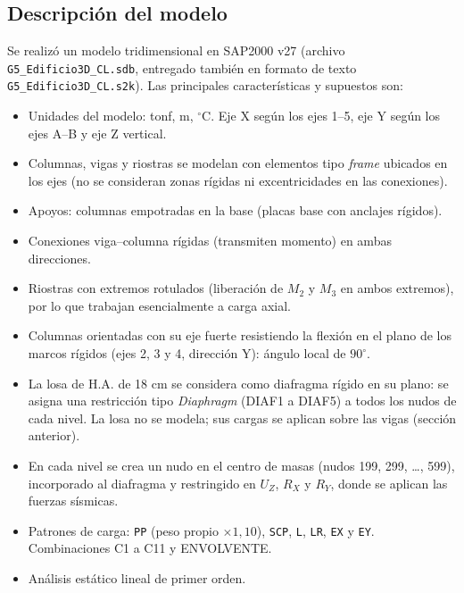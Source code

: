 \documentclass[11pt,letterpaper]{article}
\begin{document}
\subsection{Descripción del modelo}
Se realizó un modelo tridimensional en SAP2000 v27 (archivo \texttt{G5\_Edificio3D\_CL.sdb}, entregado también
en formato de texto \texttt{G5\_Edificio3D\_CL.s2k}). Las principales características y supuestos son:
\begin{itemize}
  \item Unidades del modelo: tonf, m, $^\circ$C. Eje X según los ejes 1--5, eje Y según los ejes A--B y eje Z vertical.
  \item Columnas, vigas y riostras se modelan con elementos tipo \emph{frame} ubicados en los ejes
        (no se consideran zonas rígidas ni excentricidades en las conexiones).
  \item Apoyos: columnas empotradas en la base (placas base con anclajes rígidos).
  \item Conexiones viga--columna rígidas (transmiten momento) en ambas direcciones.
  \item Riostras con extremos rotulados (liberación de $M_2$ y $M_3$ en ambos extremos), por lo que trabajan
        esencialmente a carga axial.
  \item Columnas orientadas con su eje fuerte resistiendo la flexión en el plano de los marcos rígidos
        (ejes 2, 3 y 4, dirección Y): ángulo local de $90^\circ$.
  \item La losa de H.A. de 18 cm se considera como diafragma rígido en su plano: se asigna una restricción
        tipo \emph{Diaphragm} (DIAF1 a DIAF5) a todos los nudos de cada nivel. La losa no se modela; sus cargas
        se aplican sobre las vigas (sección anterior).
  \item En cada nivel se crea un nudo en el centro de masas (nudos 199, 299, \dots, 599), incorporado al diafragma
        y restringido en $U_Z$, $R_X$ y $R_Y$, donde se aplican las fuerzas sísmicas.
  \item Patrones de carga: \texttt{PP} (peso propio $\times 1{,}10$), \texttt{SCP}, \texttt{L}, \texttt{LR},
        \texttt{EX} y \texttt{EY}. Combinaciones C1 a C11 y ENVOLVENTE.
  \item Análisis estático lineal de primer orden.
\end{itemize}
\end{document}
